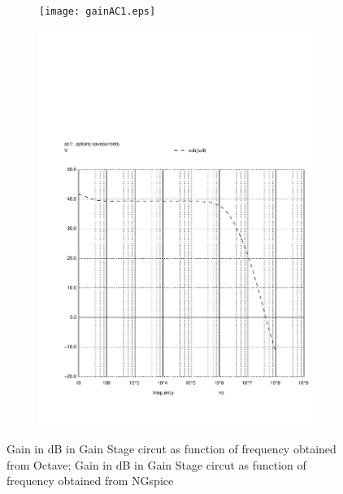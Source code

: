 \begin{figure}[h]
    \centering
    \begin{subfigure}{0.23\textwidth}
        \texttt{[image: gainAC1.eps]}
        \label{fig:output1}
    \end{subfigure}
    \begin{subfigure}{0.23\textwidth}
        \includegraphics[width=\linewidth, clip]{vo1f.pdf}
        \label{fig:output2}
    \end{subfigure}
    \caption{\small Gain in dB  in Gain Stage circut as function of frequency obtained from Octave; Gain in dB  in Gain Stage circut as function of frequency obtained from NGspice}
    \label{output_deviation}
\end{figure}

